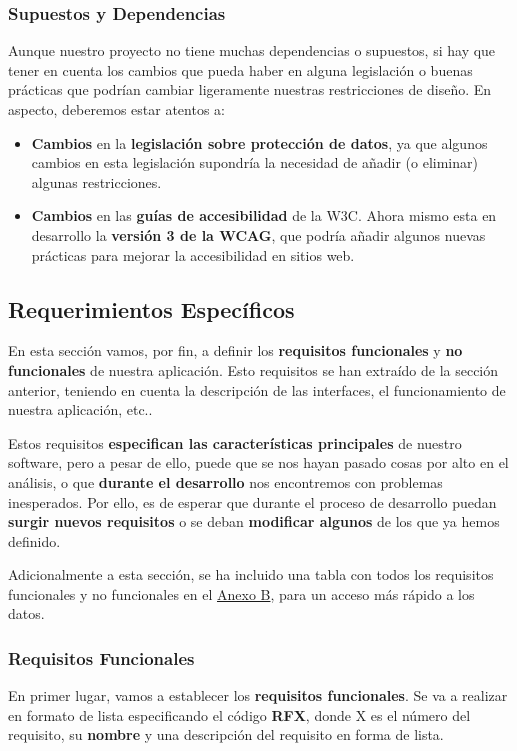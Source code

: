 \subsubsection{Supuestos y Dependencias}
Aunque nuestro proyecto no tiene muchas dependencias o supuestos, si hay que tener en cuenta los cambios que pueda haber en alguna legislación o buenas prácticas que podrían cambiar ligeramente nuestras restricciones de diseño. En aspecto, deberemos estar atentos a:

\begin{itemize}
	\item \textbf{Cambios} en la \textbf{legislación sobre protección de datos}, ya que algunos cambios en esta legislación supondría la necesidad de añadir (o eliminar) algunas restricciones.
	
	\item \textbf{Cambios} en las \textbf{guías de accesibilidad} de la W3C. Ahora mismo esta en desarrollo la \textbf{versión 3 de la WCAG}, que podría añadir algunos nuevas prácticas para mejorar la accesibilidad en sitios web.
\end{itemize}


\subsection{Requerimientos Específicos}
En esta sección vamos, por fin, a definir los \textbf{requisitos funcionales} y \textbf{no funcionales} de nuestra aplicación. Esto requisitos se han extraído de la sección anterior, teniendo en cuenta la descripción de las interfaces, el funcionamiento de nuestra aplicación, etc..

Estos requisitos \textbf{especifican las características principales} de nuestro software, pero a pesar de ello, puede que se nos hayan pasado cosas por alto en el análisis, o que \textbf{durante el desarrollo} nos encontremos con problemas inesperados. Por ello, es de esperar que durante el proceso de desarrollo puedan \textbf{surgir nuevos requisitos} o se deban \textbf{modificar algunos} de los que ya hemos definido.

Adicionalmente a esta sección, se ha incluido una tabla con todos los requisitos funcionales y no funcionales en el  \hyperref[sec:apenB]{Anexo B}, para un acceso más rápido a los datos.

\subsubsection{Requisitos Funcionales}
En primer lugar, vamos a establecer los \textbf{requisitos funcionales}. Se va a realizar en formato de lista especificando el código \textbf{RFX}, donde X es el número del requisito, su \textbf{nombre} y una descripción del requisito en forma de lista. 

